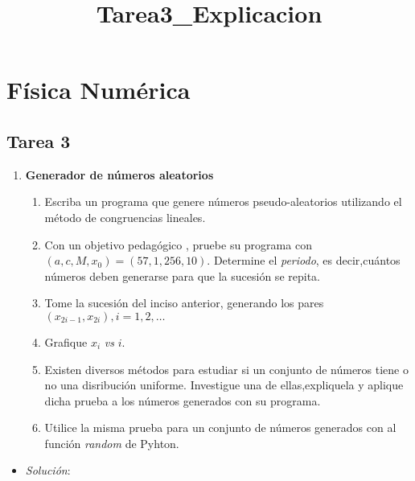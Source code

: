 \documentclass[11pt]{article}
\title{Tarea3\_Explicacion}
\providecommand{\tightlist}{%
      \setlength{\itemsep}{0pt}\setlength{\parskip}{0pt}}
\begin{document}
    
    \maketitle
    
    

    
    \hypertarget{fuxedsica-numuxe9rica}{%
\section{Física Numérica}\label{fuxedsica-numuxe9rica}}

    \hypertarget{tarea-3}{%
\subsection{Tarea 3}\label{tarea-3}}

    \begin{enumerate}
\def\labelenumi{\arabic{enumi}.}
\item
  \textbf{Generador de números aleatorios}

  \begin{enumerate}
  \def\labelenumii{(\alph{enumii})}
  \item
    Escriba un programa que genere números pseudo-aleatorios utilizando
    el método de congruencias lineales.
  \item
    Con un objetivo pedagógico , pruebe su programa con
    \((a, c, M, x_0) =(57, 1, 256, 10)\). Determine el \emph{periodo},
    es decir,cuántos números deben generarse para que la sucesión se
    repita.
  \item
    Tome la sucesión del inciso anterior, generando los pares
    \((x_{2i-1}, x_{2i}), i = 1, 2,\dots\)
  \item
    Grafique \(x_i\) \emph{vs} \(i\).
  \item
    Existen diversos métodos para estudiar si un conjunto de números
    tiene o no una disribución uniforme. Investigue una de
    ellas,expliquela y aplique dicha prueba a los números generados con
    su programa.
  \item
    Utilice la misma prueba para un conjunto de números generados con al
    función \emph{random} de Pyhton.
  \end{enumerate}
\end{enumerate}

    \begin{itemize}
\tightlist
\item
  \emph{Solución}:
\end{itemize}
\end{document}
